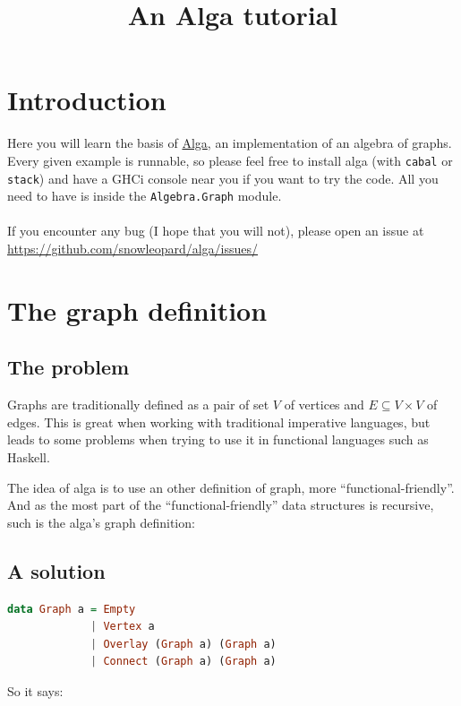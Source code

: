 \documentclass[10pt,a4paper]{article}
\title{An Alga tutorial}
\date{}
\begin{document}
\maketitle
\tableofcontents
\section{Introduction}

Here you will learn the basis of \href{http://hackage.haskell.org/package/algebraic-graphs}{Alga}, an implementation of an algebra of graphs.
Every given example is runnable, so please feel free to install alga (with \verb|cabal| or \verb|stack|) and have a GHCi console near you if you want to try the code. All you need to have is inside the \verb|Algebra.Graph| module.
\\
\\
If you encounter any bug (I hope that you will not), please open an issue at \url{https://github.com/snowleopard/alga/issues/}

\section{The graph definition}
\subsection{The problem}
Graphs are traditionally defined as a pair of set $V$ of vertices and $E \subseteq V \times V$ of edges. This is great when working with traditional imperative languages, but leads to some problems when trying to use it in functional languages such as Haskell.

The idea of alga is to use an other definition of graph, more “functional-friendly”. And as the most part of the “functional-friendly” data structures is recursive, such is the alga’s graph definition:

\subsection{A solution}
\begin{lstlisting}[language=Haskell, frame=single]
data Graph a = Empty
             | Vertex a
             | Overlay (Graph a) (Graph a)
             | Connect (Graph a) (Graph a)
\end{lstlisting}

So it says:
\end{document}
